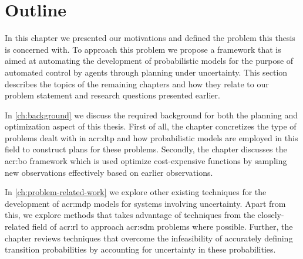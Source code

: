\section{Outline}
\label{sec:introduction-outline}

In this chapter we presented our motivations and defined the problem this thesis is concerned with.
To approach this problem we propose a framework that is aimed at automating the development of probabilistic models for the purpose of automated control by agents through planning under uncertainty.
This section describes the topics of the remaining chapters and how they relate to our problem statement and research questions presented earlier.

In \autoref{ch:background} we discuss the required background for both the planning and optimization aspect of this thesis.
First of all, the chapter concretizes the type of problems dealt with in \acrshort{acr:dtp} and how probabilistic models are employed in this field to construct plans for these problems.
Secondly, the chapter discusses the \acrshort{acr:bo} framework which is used optimize cost-expensive functions by sampling new observations effectively based on earlier observations.

In \autoref{ch:problem-related-work} we explore other existing techniques for the development of \acrshort{acr:mdp} models for systems involving uncertainty.
Apart from this, we explore methods that takes advantage of techniques from the closely-related field of \acrshort{acr:rl} to approach \acrshort{acr:sdm} problems where possible.
Further, the chapter reviews techniques that overcome the infeasibility of accurately defining transition probabilities by accounting for uncertainty in these probabilities.

